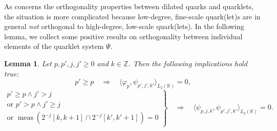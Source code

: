 \documentclass{article}
\newtheorem{lemma}[propo]{Lemma}
\DeclareMathOperator{\meas}{meas}
\begin{document}
As concerns the orthogonality properties between dilated quarks and quarklets, the situation is more complicated because low-degree, fine-scale quark(let)s are in general \emph{not} orthogonal to high-degree, low-scale quark(lets). In the following lemma, we collect some positive results on orthogonality between individual elements of the quarklet system $\Psi$.
\begin{lemma}
Let $p,p',j,j'\ge 0$ and $k\in\mathbb Z$. Then the following implications hold true:
\begin{equation}\label{eq:phippsippjpkporthocond}
p'\ge p\quad\Rightarrow\quad
\langle\varphi_p,\psi_{p',j',k'}\rangle_{L_2(\mathbb R)}=0,
\end{equation}
\begin{equation}\label{eq:psipjkpsippjpkporthocond}
\left.\begin{aligned}
p'\ge p\wedge j'>j\\
\text{or }p'>p\wedge j'\ge j\\
\text{or } \meas(2^{-j}[k,k+1]\cap 2^{-j}[k',k'+1])=0
\end{aligned}\right\}
\quad\Rightarrow\quad
\langle\psi_{p,j,k},\psi_{p',j',k'}\rangle_{L_2(\mathbb R)}=0.
\end{equation}
\end{lemma}
\end{document}
